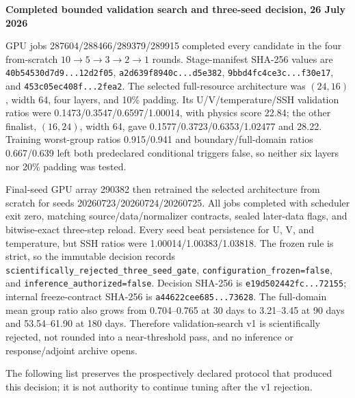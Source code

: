 \documentclass[11pt]{article}
\newenvironment{examplebox}[1]
  {\begin{center}\begin{lrbox}{\examplestore}\begin{minipage}{0.92\textwidth}%
   \textbf{#1}\par\smallskip}
  {\end{minipage}\end{lrbox}\setlength{\fboxsep}{8pt}%
   \fcolorbox{blue}{lightblue}{\usebox{\examplestore}}\end{center}}
\begin{document}
\begin{examplebox}{Completed bounded validation search and three-seed decision,
26 July 2026}
GPU jobs 287604/288466/289379/289915 completed every candidate in the four
from-scratch \(10\rightarrow5\rightarrow3\rightarrow2\rightarrow1\) rounds.
Stage-manifest SHA-256 values are \texttt{40b54530d7d9...12d2f05},
\texttt{a2d639f8940c...d5e382}, \texttt{9bbd4fc4ce3c...f30e17}, and
\texttt{453c05ec408f...2fea2}.  The selected full-resource architecture was
\((24,16)\), width 64, four layers, and 10\% padding.  Its
U/V/temperature/SSH validation ratios were
0.1473/0.3547/0.6597/1.00014, with physics score 22.84; the other finalist,
\((16,24)\), width 64, gave 0.1577/0.3723/0.6353/1.02477 and 28.22.
Training worst-group ratios 0.915/0.941 and boundary/full-domain ratios
0.667/0.639 left both predeclared conditional triggers false, so neither six layers nor
20\% padding was tested.

Final-seed GPU array 290382 then retrained the selected architecture from scratch for
seeds 20260723/20260724/20260725.  All jobs completed with scheduler exit zero, matching
source/data/normalizer contracts, sealed later-data flags, and bitwise-exact three-step
reload.  Every seed beat persistence for U, V, and temperature, but SSH ratios were
1.00014/1.00383/1.03818.  The frozen rule is strict, so the immutable decision records
\texttt{scientifically\_rejected\_three\_seed\_gate},
\texttt{configuration\_frozen=false}, and
\texttt{inference\_authorized=false}.  Decision SHA-256 is
\texttt{e19d502442fc...72155}; internal freeze-contract SHA-256 is
\texttt{a44622cee685...73628}.  The full-domain mean group ratio also grows from
0.704--0.765 at 30 days to 3.21--3.45 at 90 days and 53.54--61.90 at 180 days.
Therefore validation-search v1 is scientifically rejected, not rounded into a
near-threshold pass, and no inference or response/adjoint archive opens.
\end{examplebox}

The following list preserves the prospectively declared protocol that produced this
decision; it is not authority to continue tuning after the v1 rejection.
\end{document}
